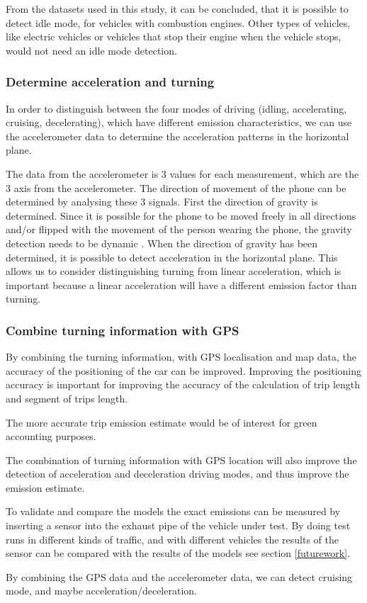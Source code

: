 From the datasets used in this study, it can be concluded, that it is possible to detect idle mode, for vehicles with combustion engines. Other types of vehicles, like electric vehicles or vehicles that stop their engine when the vehicle stops, would not need an idle mode detection.

\subsubsection{Determine acceleration and turning}
In order to distinguish between the four modes of driving (idling, accelerating, cruising, decelerating), which have different emission characteristics, we can use the accelerometer data to determine the acceleration patterns in the horizontal plane.

The data from the accelerometer is 3 values for each measurement, which are the 3 axis from the accelerometer. The direction of movement of the phone can be determined by analysing these 3 signals. First the direction of gravity is determined. Since it is possible for the phone to be moved freely in all directions and/or flipped with the movement of the person wearing the phone, the gravity detection needs to be dynamic \cite{Hemminki2013}. When the direction of gravity has been determined, it is possible to detect acceleration in the horizontal plane. This allows us to consider distinguishing turning from linear acceleration, which is important because a linear acceleration will have a different emission factor than turning.

\subsubsection{Combine turning information with GPS }

By combining the turning information, with GPS localisation and map data, the accuracy of the positioning of the car can be improved. Improving the positioning accuracy is important for improving the accuracy of the calculation of trip length and segment of trips length.

The more accurate trip emission estimate would be of interest for green accounting purposes.

The combination of turning information with GPS location will also improve the detection of acceleration and deceleration driving modes, and thus improve the emission estimate.


To validate and compare the models the exact emissions can be measured by inserting a sensor into the exhaust pipe of the vehicle under test. By doing test runs in different kinds of traffic, and with different vehicles the results of the sensor can be compared with the results of the models see section \ref{futurework}.

By combining the GPS data and the accelerometer data, we can detect cruising mode, and maybe acceleration/deceleration.

